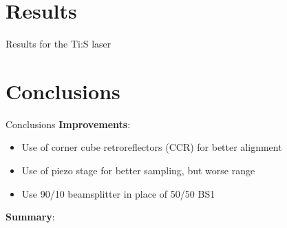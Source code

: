 \documentclass[11pt]{beamer}
\begin{document}
\section{Results}
\begin{frame}{Results for the Ti:S laser}

\end{frame}
\section{Conclusions}
\begin{frame}{Conclusions}
\textbf{Improvements}:\\
	\begin{itemize}
		\item Use of corner cube retroreflectors (CCR) for better alignment
		\item Use of piezo stage for better sampling, but worse range
		\item Use 90/10 beamsplitter in place of 50/50 BS1
	\end{itemize}
	
	\vspace{5pt}
\textbf{Summary}:\\
	
\end{frame}
\end{document}
